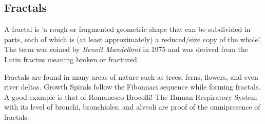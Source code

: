 \documentclass{resonance}
\begin{document}
\subsection*{Fractals}


A fractal is 'a rough or fragmented geometric shape that can be subdivided in parts, each of which is (at least approximately) a reduced/size copy of the whole'. The term was coined by \textit{Benoît Mandelbrot} in 1975 and was derived from the Latin fractus meaning broken or fractured.

Fractals are found in many areas of nature such as trees, ferns, flowers, and even river deltas. Growth Spirals follow the Fibonnaci sequence while forming fractals. A good example is that of Romanesco Brocolli! The Human Respiratory System with its level of bronchi, bronchioles, and alveoli are proof of the omnipresence of fractals.
\end{document}
